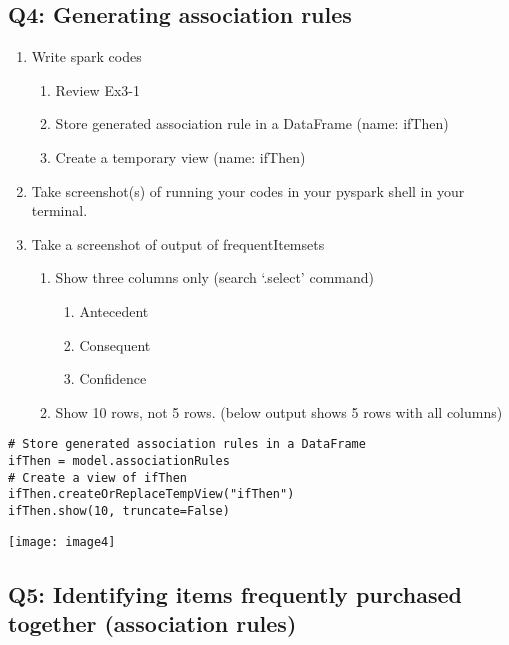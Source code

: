 \documentclass[]{article}
\begin{document}
\subsection*{Q4: Generating association rules}
\begin{enumerate}[before=\itshape,label=\arabic*.]
	\item Write spark codes
	\begin{enumerate}[before=\itshape,label=\alph*.]
		\item Review Ex3-1
		\item Store generated association rule in a DataFrame (name: ifThen)
		\item Create a temporary view (name: ifThen)
	\end{enumerate}
	\item Take screenshot(s) of running your codes in your pyspark shell in your terminal.
	\item Take a screenshot of output of frequentItemsets
	\begin{enumerate}[before=\itshape,label=\alph*.]
		\item Show three columns only (search ‘.select’ command)
		\begin{enumerate}[before=\itshape,label=\roman*.]
			\item Antecedent
			\item Consequent
			\item Confidence
		\end{enumerate}
		\item Show 10 rows, not 5 rows. (below output shows 5 rows with all columns)
	\end{enumerate}
\end{enumerate} 

\begin{verbatim}
# Store generated association rules in a DataFrame
ifThen = model.associationRules
# Create a view of ifThen
ifThen.createOrReplaceTempView("ifThen")
ifThen.show(10, truncate=False)
\end{verbatim}
\texttt{[image: image4]}

\clearpage

\subsection*{Q5: Identifying items frequently purchased together (association rules)}
\end{document}
